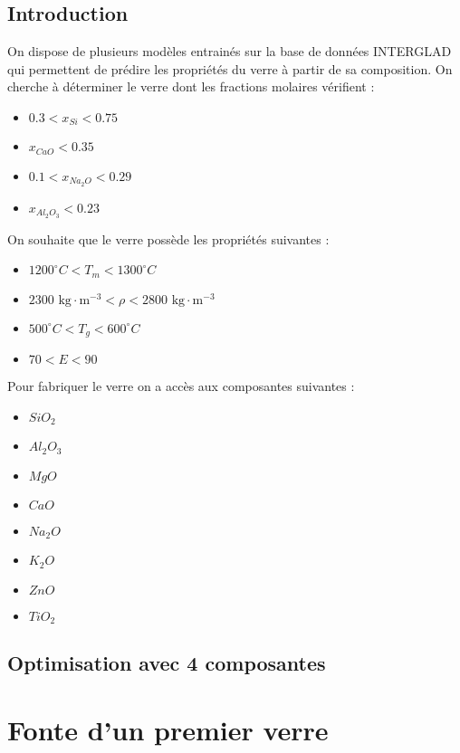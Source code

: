 \documentclass{article}
\begin{document}
\subsection{Introduction}

On dispose de plusieurs modèles entrainés sur la base de données INTERGLAD qui permettent de prédire les propriétés du verre à partir de sa composition. On cherche à déterminer le verre dont les fractions molaires vérifient :

\begin{itemize}
    \item $0.3 < x_{Si} < 0.75$
    \item $x_{CaO} < 0.35$
    \item $0.1 < x_{Na_2O} < 0.29$
    \item $x_{Al_2O_3} < 0.23$
\end{itemize} 

On souhaite que le verre possède les propriétés suivantes :
\begin{itemize}
    \item $1200 ^{\circ} C < T_m < 1300 ^{\circ} C$
    \item $2300 \text{ kg} \cdot \text{m}^{-3} < \rho < 2800 \text{ kg} \cdot \text{m}^{-3}$
    \item $500 ^{\circ} C < T_g < 600 ^{\circ} C$
    \item $70 < E < 90$
\end{itemize}


Pour fabriquer le verre on a accès aux composantes suivantes :

\begin{itemize}
    \item $SiO_2$
    \item $Al_2O_3$
    \item $MgO$
    \item $CaO$
    \item $Na_2O$
    \item $K_2O$
    \item $ZnO$
    \item $TiO_2$
\end{itemize}

\subsection{Optimisation avec 4 composantes}

\section{Fonte d'un premier verre}
\end{document}
